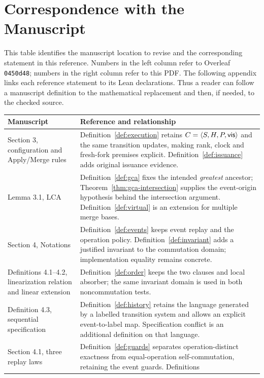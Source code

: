 \section{Correspondence with the Manuscript}
\label{app:correspondence}

This table identifies the manuscript location to revise and the corresponding
statement in this reference. Numbers in the left column refer to Overleaf
\texttt{0450d48}; numbers in the right column refer to this PDF. The following
appendix links each reference statement to its Lean declarations. Thus a reader
can follow a manuscript definition to the mathematical replacement and then,
if needed, to the checked source.

\begin{longtable}{@{}>{\raggedright\arraybackslash}p{}>{\raggedright\arraybackslash}p{}@{}}
\toprule
Manuscript & Reference and relationship \\
\midrule
\endhead
Section 3, configuration and Apply/Merge rules &
Definition~\ref{def:execution} retains $C=\langle S,H,P,\mathsf{vis}\rangle$ and the
same transition updates, making rank, clock and fresh-fork premises explicit.
Definition~\ref{def:issuance} adds original issuance evidence. \\[5pt]
Lemma 3.1, LCA &
Definition~\ref{def:gca} fixes the intended \emph{greatest} ancestor;
Theorem~\ref{thm:gca-intersection} supplies the event-origin hypothesis behind
the intersection argument. Definition~\ref{def:virtual} is an extension for
multiple merge bases. \\[5pt]
Section 4, Notations &
Definition~\ref{def:events} keeps event replay and the operation policy.
Definition~\ref{def:invariant} adds a justified invariant to the commutation
domain; implementation equality remains concrete. \\[5pt]
Definitions 4.1--4.2, linearization relation and linear extension &
Definition~\ref{def:order} keeps the two clauses and local absorber;
the same invariant domain is used in both noncommutation tests. \\[5pt]
Definition 4.3, sequential specification &
Definition~\ref{def:history} retains the language generated by a labelled
transition system and allows an explicit event-to-label map. Specification
conflict is an additional definition on that language. \\[5pt]
Section 4.1, three replay laws &
Definition~\ref{def:guards} separates operation-distinct exactness from
equal-operation self-commutation, retaining the event guards. Definitions

\end{longtable}
